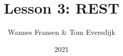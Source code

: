 \documentclass{beamer}
\title{Lesson 3: REST} %
\author{Wannes Fransen \& Tom Eversdijk}
\institute{UC Leuven}
\date{2021}
\begin{document}
\frame{\titlepage}



%
\end{document}
